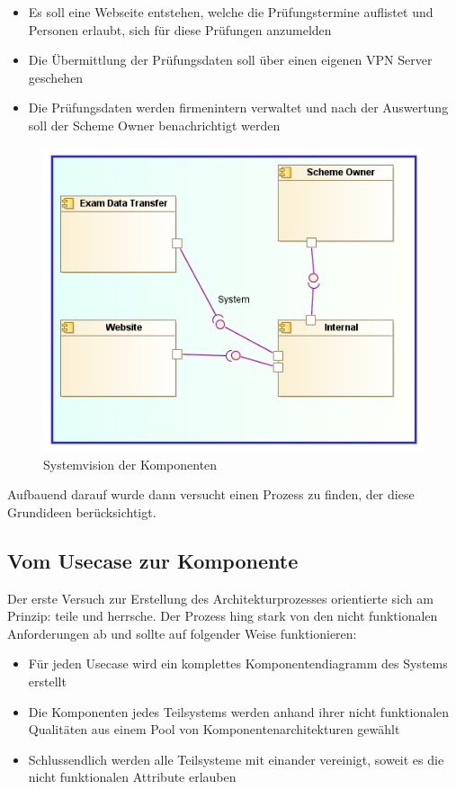 \begin{itemize}
  \item Es soll eine Webseite entstehen, welche die Prüfungstermine auflistet und Personen erlaubt, sich für diese Prüfungen anzumelden
  \item Die Übermittlung der Prüfungsdaten soll über einen eigenen VPN Server geschehen
  \item Die Prüfungsdaten werden firmenintern verwaltet und nach der Auswertung soll der Scheme Owner benachrichtigt werden
\end{itemize}

\begin{figure}[!htbp]
    \centering
    \includegraphics[scale=0.6]{uml/vision.png}
    \caption{Systemvision der Komponenten}
\end{figure}

Aufbauend darauf wurde dann versucht einen Prozess zu finden, der diese Grundideen berücksichtigt.

\subsection{Vom Usecase zur Komponente}
Der erste Versuch zur Erstellung des Architekturprozesses orientierte sich am Prinzip: teile und herrsche. Der Prozess hing stark von den nicht funktionalen Anforderungen ab und sollte auf folgender Weise funktionieren:

\begin{itemize}
  \item Für jeden Usecase wird ein komplettes Komponentendiagramm des Systems erstellt
  \item Die Komponenten jedes Teilsystems werden anhand ihrer nicht funktionalen Qualitäten aus einem Pool von Komponentenarchitekturen gewählt
  \item Schlussendlich werden alle Teilsysteme mit einander vereinigt, soweit es die nicht funktionalen Attribute erlauben
\end{itemize}

